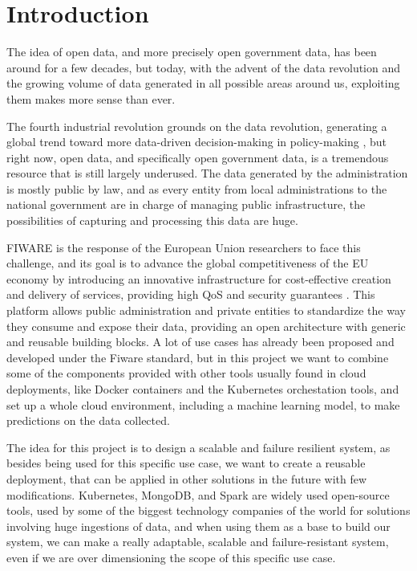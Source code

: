 \chapter{Introduction}
\label{chapter:Introduction}

The idea of open data, and more precisely open government data, has been around for a few decades, but today, with the advent of the data revolution and the growing volume of data generated in all possible areas around us, exploiting them makes more sense than ever.

The fourth industrial revolution grounds on the data revolution, generating a global trend toward more data-driven decision-making in policy-making \cite{open-janssen}, but right now, open data,  and specifically open government data, is a tremendous resource that is still largely underused. The data generated by the administration is mostly public by law, and as every entity from local administrations to the national government are in charge of managing public infrastructure, the possibilities of capturing and processing this data are huge.

FIWARE is the response of the European Union researchers to face this challenge, and its goal is to advance the global competitiveness of the EU economy by introducing an innovative infrastructure for cost-effective creation and delivery of services, providing high QoS and security guarantees \cite{fiware}. This platform allows public administration and private entities to standardize the way they consume and expose their data, providing an open architecture with generic and reusable building blocks. A lot of use cases has already been proposed and developed under the Fiware standard, but in this project we want to combine some of the components provided with other tools usually found in cloud deployments, like Docker containers and the Kubernetes orchestation tools, and set up a whole cloud environment, including a machine learning model, to make predictions on the data collected.

The idea for this project is to design a scalable and failure resilient system, as besides being used for this specific use case, we want to create a reusable deployment, that can be applied in other solutions in the future with few modifications.  Kubernetes, MongoDB, and Spark are widely used open-source tools, used by some of the biggest technology companies of the world for solutions involving huge ingestions of data, and when using them as a base to build our system, we can make a really adaptable, scalable and failure-resistant system, even if we are over dimensioning the scope of this specific use case.

